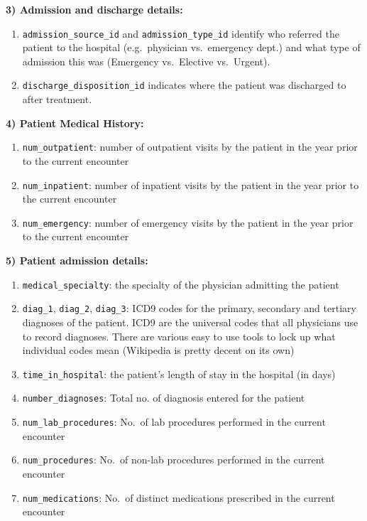 \documentclass[
]{article}
\providecommand{\tightlist}{%
  \setlength{\itemsep}{0pt}\setlength{\parskip}{0pt}}
\begin{document}
\textbf{3) Admission and discharge details:}

\begin{enumerate}
\def\labelenumi{\alph{enumi}.}
\tightlist
\item
  \texttt{admission\_source\_id} and \texttt{admission\_type\_id}
  identify who referred the patient to the hospital (e.g.~physician
  vs.~emergency dept.) and what type of admission this was (Emergency
  vs.~Elective vs.~Urgent).
\item
  \texttt{discharge\_disposition\_id} indicates where the patient was
  discharged to after treatment.
\end{enumerate}

\textbf{4) Patient Medical History:}

\begin{enumerate}
\def\labelenumi{\alph{enumi}.}
\tightlist
\item
  \texttt{num\_outpatient}: number of outpatient visits by the patient
  in the year prior to the current encounter
\item
  \texttt{num\_inpatient}: number of inpatient visits by the patient in
  the year prior to the current encounter
\item
  \texttt{num\_emergency}: number of emergency visits by the patient in
  the year prior to the current encounter
\end{enumerate}

\textbf{5) Patient admission details:}

\begin{enumerate}
\def\labelenumi{\alph{enumi}.}
\tightlist
\item
  \texttt{medical\_specialty}: the specialty of the physician admitting
  the patient
\item
  \texttt{diag\_1}, \texttt{diag\_2}, \texttt{diag\_3}: ICD9 codes for
  the primary, secondary and tertiary diagnoses of the patient. ICD9 are
  the universal codes that all physicians use to record diagnoses. There
  are various easy to use tools to lock up what individual codes mean
  (Wikipedia is pretty decent on its own)
\item
  \texttt{time\_in\_hospital}: the patient's length of stay in the
  hospital (in days)
\item
  \texttt{number\_diagnoses}: Total no. of diagnosis entered for the
  patient
\item
  \texttt{num\_lab\_procedures}: No.~of lab procedures performed in the
  current encounter
\item
  \texttt{num\_procedures}: No.~of non-lab procedures performed in the
  current encounter
\item
  \texttt{num\_medications}: No.~of distinct medications prescribed in
  the current encounter
\end{enumerate}
\end{document}
